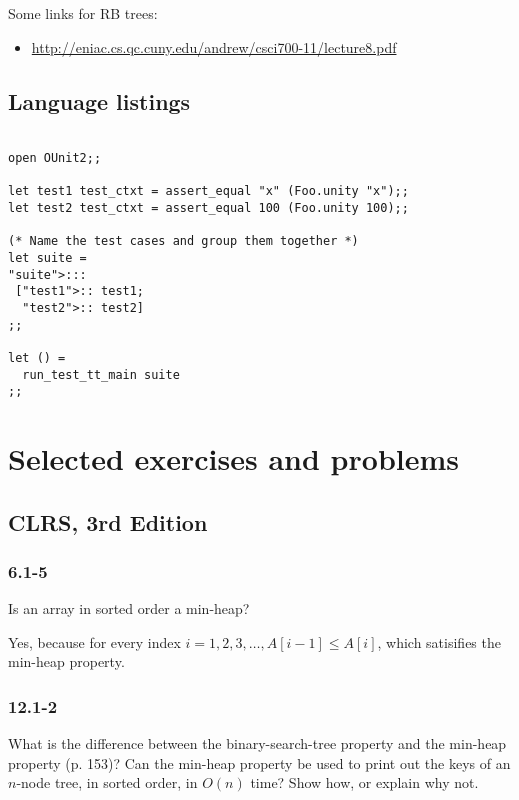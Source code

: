 \documentclass{article}
\begin{document}
Some links for RB trees:

\begin{itemize}
\item \href{http://eniac.cs.qc.cuny.edu/andrew/csci700-11/lecture8.pdf}{%
http://eniac.cs.qc.cuny.edu/andrew/csci700-11/lecture8.pdf}
\end{itemize}

\subsection{Language listings}

\begin{lstlisting}[frame=single]  % Start your code-block

open OUnit2;;

let test1 test_ctxt = assert_equal "x" (Foo.unity "x");;
let test2 test_ctxt = assert_equal 100 (Foo.unity 100);;

(* Name the test cases and group them together *)
let suite =
"suite">:::
 ["test1">:: test1;
  "test2">:: test2]
;;

let () =
  run_test_tt_main suite
;;
\end{lstlisting}

\section{Selected exercises and problems}


\subsection{CLRS, 3rd Edition}

\subsubsection{6.1-5} Is an array in sorted order a min-heap?

Yes, because for every index $i = 1, 2, 3,\ldots, A[i-1] \leq A[i]$,
which satisifies the min-heap property.

\subsubsection{12.1-2} What is the difference between the binary-search-tree
property and the min-heap property (p. 153)? Can the min-heap property be used
to print out the keys of an $n$-node tree, in sorted order, in $O(n)$ time?
Show how, or explain why not.
\end{document}

